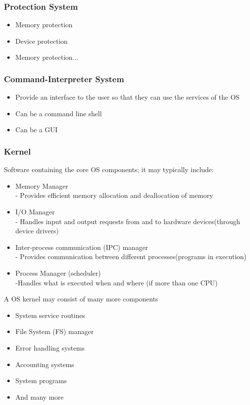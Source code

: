 \documentclass[11pt]{article}
\theoremstyle{definition}
\begin{document}
        \subsubsection{Protection System}
            \begin{itemize}
                \item Memory protection
                \item Device protection
                \item Memory protection...
            \end{itemize}
        \subsubsection{Command-Interpreter System}
            \begin{itemize}
                \item Provide an interface to the user so that they can use the services of the OS
                \item Can be a command line shell
                \item Can be a GUI
            \end{itemize}
        \subsubsection{Kernel}
            Software containing the core OS components; it may typically include:
            \begin{itemize}
                \item Memory Manager
                    \\ - Provides efficient memory allocation and deallocation of memory
                \item I/O Manager
                    \\ - Handles input and output requests from and to hardware devices(through device drivers)
                \item Inter-process communication (IPC) manager
                    \\ - Provides communication between different processes(programs in execution)
                \item Process Manager (scheduler)
                    \\ -Handles what is executed when and where (if more than one CPU)
            \end{itemize}
            A OS kernel may consist of many more components
            \begin{itemize}
                \item System service routines
                \item File System (FS) manager
                \item Error handling systems
                \item Accounting systems
                \item System programs
                \item And many more
            \end{itemize}
    \clearpage
\end{document}
